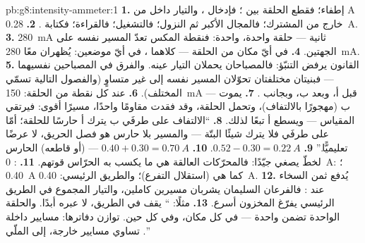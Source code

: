 \begin{solution}{pb:g8:intensity-ammeter:1}
\textbf{1.} إطفاء؛ فقطع الحلقة بين  ؛ فإدخال
، والتيار داخل من \unit{A} خارج من المشترك؛
فالمجال الأكبر ثم النزول؛ فالتشغيل؛ فالقراءة؛ فكتابة .
\textbf{2.} \qty{0.28}{A}.
\textbf{3.} \qty{280}{mA} ثانية --- حلقة واحدة،  واحدة:
فنقطة المكس تعدّ المسير نفسه على الجهتين.
\textbf{4.} في أيّ مكان من الحلقة --- كلاهما ، في
أيّ موضعين: يُظهران معًا \qty{280}{mA}.
\textbf{5.} القانون يرفض التنبّؤ: فالمصباحان 
يحملان التيار عينه. والفرق في المصباحين نفسيهما --- فبنيتان
مختلفتان تحوّلان المسير نفسه إلى  غير متساوٍ (والفصول
التالية تسمّي المختلف).
\textbf{6.} عند كل نقطة من الحلقة: \qty{150}{mA} --- قبل أ،
وبعد ب، وبجانب .
\textbf{7.} يموت ب (مهجورًا بالالتفاف)، وتحمل الحلقة، وقد
فقدت مقاومًا واحدًا، مسيرًا أقوى: فيرتقي المقياس --- ويسطع
 أ تبعًا لذلك.
\textbf{8.} ``الالتفاف على طرفَي ب يترك  أ حارسًا
للحلقة؛ أمّا على طرفَي  فلا يترك شيئًا البتّة ---
والمسير بلا حارس هو فصل الحريق، لا عرضًا تعليميًّا.''
\textbf{9.} $0.52 - 0.30 = \qty{0.22}{A}$.
\textbf{10.} $0.40 + 0.30 = \qty{0.70}{A}$ ---   (أو
قاطعه) الحارس لخطّ  يصغي جيّدًا: فالمحرّكات العالقة هي
ما يكسب به الحرّاس قوتهم.
\textbf{11.}  : \qty{0}{A}؛  :
\qty{0.40}{A} كما هي (استقلال التفرع)؛ والطريق الرئيسي:
\qty{0.40}{A}.
\textbf{12.} يُدفع ثمن السخاء عند : فالفرعان السليمان
يشربان مسيرين كاملين، والتيار المجموع في الطريق الرئيسي يفرّغ
المخزون أسرع.
\textbf{13.} مثلًا: `` يقف في الطريق، لا عبره
أبدًا. والحلقة الواحدة تضمن  واحدة --- في كل مكان، وفي كل
حين.  توازن دفاترها: مسايير داخلة تساوي مسايير خارجة،
إلى الملّي .''
\end{solution}
